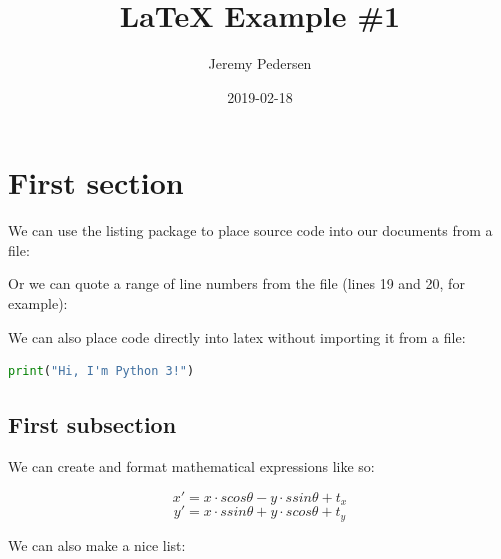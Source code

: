 \documentclass[a4paper,12pt]{article} %
\title{\LaTeX \space{} Example \#1}
\author{Jeremy Pedersen}
\date{2019-02-18} %
\begin{document}
\maketitle %

\section{First section} %

We can use the listing package to place source code into our documents from a file:

\vspace{5mm}

\vspace{5mm}

\noindent
Or we can quote a range of line numbers from the file (lines 19 and 20, for example):

\vspace{5mm}

\vspace{5mm}

\clearpage

\noindent
We can also place code directly into latex without importing it from a file:

\vspace{5mm}
\begin{lstlisting}[language=Python]
print("Hi, I'm Python 3!")
\end{lstlisting}
\vspace{5mm}

\subsection{First subsection} %

We can create and format mathematical expressions like so:

\vspace{2mm}
$$x' = x \cdot s cos \theta - y \cdot s sin \theta + t_x$$
$$y' = x \cdot s sin \theta + y \cdot s cos \theta + t_y$$
\vspace{2mm}

\noindent
We can also make a nice list:
\end{document}
